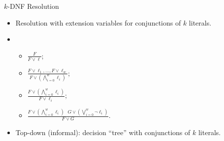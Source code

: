 \begin{frame}{$k$-DNF Resolution}

    \begin{itemize}
        \item Resolution with extension variables for conjunctions of $k$ literals.
            \pause
        \item
            \begin{itemize}
                \item $\frac{F}{F \vee \ell}$;
                \item $\frac{F \vee \ell_1, \dots, F \vee \ell_w}{F \vee (\bigwedge\limits_{i = 0}^{w}
                    \ell_i)}$;
                \item $\frac{F \vee (\bigwedge\limits_{i = 0}^{w} \ell_i)}{F \vee \ell_i}$;
                \item $\frac{F \vee (\bigwedge\limits_{i = 0}^{w} \ell_i) ~~~ G \vee (\bigvee\limits_{i =
                    0}^{w} \neg \ell_i)}{F \vee G}$.
            \end{itemize}
            \pause
        \item Top-down (informal): decision ``tree'' with conjunctions of $k$ literals.
    \end{itemize}
  
\end{frame}

